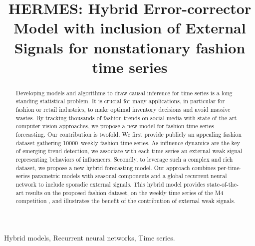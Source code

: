 \documentclass[review]{elsarticle}
\newcommand{\numberts}{10000}
\begin{document}
\begin{frontmatter}

\title{HERMES: Hybrid Error-corrector Model with inclusion of External Signals for nonstationary fashion time series}





\begin{abstract}
Developing models and algorithms to draw causal inference for time series is a long standing statistical problem. It is crucial for many applications, in particular for fashion or retail industries, to make optimal inventory decisions and avoid massive wastes. By tracking thousands of fashion trends on social media with state-of-the-art computer vision approaches, we propose a new model for fashion time series forecasting. Our contribution is  twofold. We first provide publicly an appealing fashion dataset gathering \numberts\ weekly fashion time series. As influence dynamics are the key of emerging trend detection, we associate with each time series an external weak signal representing behaviors of influencers. Secondly, to leverage such a complex and rich dataset, we propose a new hybrid forecasting model. Our approach combines per-time-series parametric models with seasonal components and a global recurrent neural network to include sporadic external signals. This hybrid model provides state-of-the-art results on the proposed fashion dataset, on the weekly time series of the M4 competition \cite{makridakis2018}, and illustrates the benefit of the contribution of external weak signals.
\end{abstract}

\begin{keyword}
Hybrid models, Recurrent neural networks, Time series.
\end{keyword}

\end{frontmatter}
\end{document}
